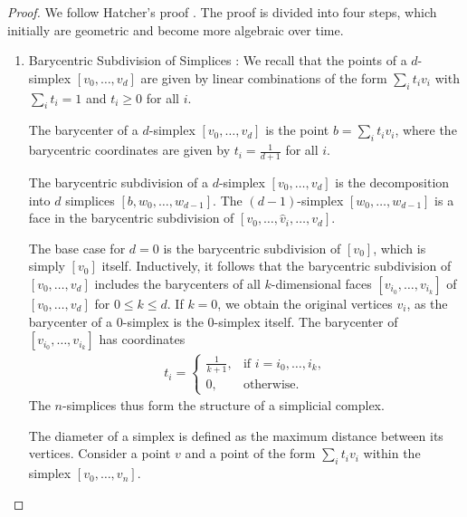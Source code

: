 \begin{proof}
	We follow Hatcher's proof \cite[\S 2.21]{hatcher2005algebraic}. The proof is divided into four steps, which initially are geometric and become more algebraic over time.
	
	\begin{enumerate}
	\item Barycentric Subdivision of Simplices \cite[\S 2.21 (1)]{hatcher2005algebraic}: We recall that the points of a $d$-simplex $[v_0, \ldots, v_d]$ are given by linear combinations of the form $\sum_{i} t_i v_i$ with $\sum_i t_i = 1$ and $t_i \geq 0$ for all $i$.
			
	\begin{definition}[Barycenter]
		The barycenter of a $d$-simplex $[v_0, \ldots, v_d]$ is the point $b = \sum_i t_i v_i$, where the barycentric coordinates are given by $t_i = \frac{1}{d+1}$ for all $i$.
	\end{definition}
			
	\begin{definition}
		The barycentric subdivision of a $d$-simplex $[v_0, \ldots, v_d]$ is the decomposition into $d$ simplices $[b, w_0, \ldots, w_{d-1}]$. The $(d-1)$-simplex $[w_0, \ldots, w_{d-1}]$ is a face in the barycentric subdivision of $[v_0, \ldots, \hat{v}_i, \ldots, v_d]$.
	\end{definition}
			
	The base case for $d=0$ is the barycentric subdivision of $[v_0]$, which is simply $[v_0]$ itself. Inductively, it follows that the barycentric subdivision of $[v_0, \ldots, v_d]$ includes the barycenters of all $k$-dimensional faces $[v_{i_0}, \ldots, v_{i_k}]$ of $[v_0, \ldots, v_d]$ for $0 \leq k \leq d$. If $k=0$, we obtain the original vertices $v_i$, as the barycenter of a $0$-simplex is the $0$-simplex itself. The barycenter of $[v_{i_0}, \ldots, v_{i_k}]$ has coordinates
	\begin{align}
		t_i = \begin{cases}
		\frac{1}{k+1}, & \text{if } i = i_0, \ldots, i_k, \\
		0,             & \text{otherwise}.                
		\end{cases}
	\end{align}
	The \(n\)-simplices thus form the structure of a simplicial complex.
			
	The diameter of a simplex is defined as the maximum distance between its vertices. Consider a point \(v\) and a point of the form \(\sum_i t_i v_i\) within the simplex \([v_0, \ldots, v_n]\).
	

\end{enumerate}
\end{proof}
